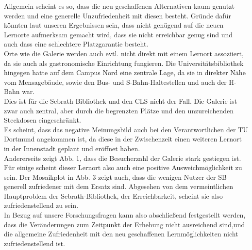 \documentclass[11pt, a4paper]{article}
\begin{document}
Allgemein scheint es so, dass die neu geschaffenen Alternativen kaum genutzt werden und eine generelle Unzufriedenheit mit diesen besteht. Gründe dafür könnten laut unseren Ergebnissen sein, dass nicht genügend auf die neuen Lernorte aufmerksam gemacht wird, dass sie nicht erreichbar genug sind und auch dass eine schlechtere Platzgarantie besteht.\\
Orte wie die Galerie werden auch evtl. nicht direkt mit einem Lernort assoziiert, da sie auch als gastronomische Einrichtung fungieren. Die Universitätsbibliothek hingegen hatte auf dem Campus Nord eine zentrale Lage, da sie in direkter Nähe vom Mensagebäude, sowie den Bus- und S-Bahn-Haltestellen und auch der H-Bahn war.\\
Dies ist für die Sebrath-Bibliothek und den CLS nicht der Fall. Die Galerie ist zwar auch zentral, aber durch die begrenzten Plätze und den unzureichenden Steckdosen eingeschränkt.\\
Es scheint, dass das negative Meinungsbild auch bei den Verantwortlichen der TU Dortmund angekommen ist, da diese in der Zwischenzeit einen weiteren Lernort in der Innenstadt geplant und eröffnet haben.\\
Andererseits zeigt Abb. 1, dass die Besucherzahl der Galerie stark gestiegen ist. 
Für einige scheint dieser Lernort also auch eine positive Ausweichmöglichkeit zu sein.
Der Mosaikplot in Abb. 3 zeigt auch, dass die wenigen Nutzer der SB generell zufriedener mit dem Ersatz sind. Abgesehen von dem vermeintlichen Hauptproblem der Sebrath-Bibliothek, der Erreichbarkeit, scheint sie also zufriedenstellend zu sein.\\
In Bezug auf unsere Forschungsfragen kann also abschließend festgestellt werden, dass die Veränderungen zum Zeitpunkt der Erhebung nicht ausreichend sind,und die allgemeine Zufriedenheit mit den neu geschaffenen Lernmöglichkeiten nicht zufriedenstellend ist.



\newpage
\end{document}

